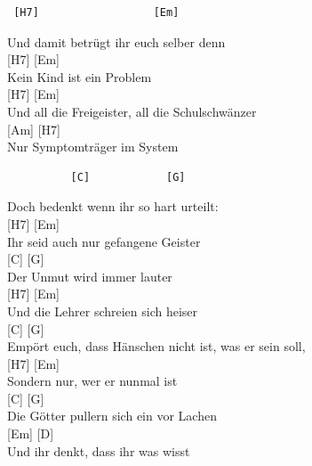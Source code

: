 \documentclass[
  letterpaper,
]{scrbook}
\begin{document}
\begin{verbatim}
 [H7]                  [Em]
\end{verbatim}

Und damit betrügt ihr euch selber denn\\
{[}H7{]} {[}Em{]}\\
Kein Kind ist ein Problem\\
{[}H7{]} {[}Em{]}\\
Und all die Freigeister, all die Schulschwänzer\\
{[}Am{]} {[}H7{]}\\
Nur Symptomträger im System

\begin{verbatim}
          [C]            [G]               
\end{verbatim}

Doch bedenkt wenn ihr so hart urteilt:\\
{[}H7{]} {[}Em{]}\\
Ihr seid auch nur gefangene Geister\\
{[}C{]} {[}G{]}\\
Der Unmut wird immer lauter\\
{[}H7{]} {[}Em{]}\\
Und die Lehrer schreien sich heiser\\
{[}C{]} {[}G{]}\\
Empört euch, dass Hänschen nicht ist, was er sein soll,\\
{[}H7{]} {[}Em{]}\\
Sondern nur, wer er nunmal ist\\
{[}C{]} {[}G{]}\\
Die Götter pullern sich ein vor Lachen\\
{[}Em{]} {[}D{]}\\
Und ihr denkt, dass ihr was wisst
\end{document}
